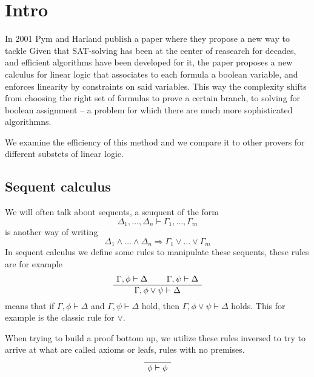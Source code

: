 \documentclass[a4paper, 12pt, tesi, english]{report}
\begin{document}
\tableofcontents

\chapter{Intro}
In 2001 Pym and Harland publish a paper \cite{HarlandPym} where they propose a new way to tackle 
Given that SAT-solving has been at the center of reasearch for decades, and efficient algorithms have been developed for it, the paper proposes a new calculus for linear logic that associates to each formula a boolean variable, and enforces linearity by constraints on said variables.
This way the complexity shifts from choosing the right set of formulas to prove a certain branch, to solving for boolean assignment -- a problem for which there are much more sophisticated algorithmns.

We examine the efficiency of this method and we compare it to other provers for different substets of linear logic.

\section{Sequent calculus}
We will often talk about sequents, a seuquent of the form
$$ \Delta_1, \dots, \Delta_n \vdash \Gamma_1, \dots, \Gamma_m $$
is another way of writing
$$ \Delta_1 \wedge \dots \wedge \Delta_n \Rightarrow \Gamma_1 \vee \dots \vee \Gamma_m $$
In sequent calculus we define some rules to manipulate these sequents, these rules are for example 
$$
\AxiomC{$\Gamma, \phi \vdash \Delta$}
\AxiomC{$\Gamma, \psi \vdash \Delta$}
\BinaryInfC{$\Gamma, \phi \vee \psi \vdash \Delta$}
\DisplayProof
$$
means that if $\Gamma, \phi \vdash \Delta$ and $\Gamma, \psi \vdash \Delta$ hold, then $\Gamma, \phi \vee \psi \vdash \Delta$ holds.
This for example is the classic rule for $\vee$.

When trying to build a proof bottom up, we utilize these rules inversed to try to arrive at what are called axioms or leafs, rules with no premises.
$$
\AxiomC{}
\UnaryInfC{$\phi \vdash \phi$}
\DisplayProof
$$
\end{document}
